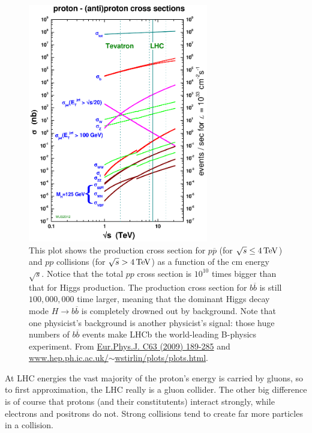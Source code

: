 \begin{figure}
\centering
\includegraphics[width=0.7\textwidth]{fig/pp_xsection}
\caption{This plot shows the production cross section for $p\overline{p}$ (for $\sqrt{s}\le 4\,\mathrm{TeV}$) and $pp$ collisions (for $\sqrt{s} > 4\,\mathrm{TeV}$) as a function of the cm energy $\sqrt{s}$. Notice that the total $pp$ cross section is $10^{10}$ times bigger than that for Higgs production. The production cross section for $b\overline{b}$ is still $100,000,000$ time larger, meaning that the dominant Higgs decay mode $H \to b\overline{b}$ is completely drowned out by background. Note that one physicist's background is another physicist's signal: those huge numbers of $b\overline{b}$ events make LHCb the world-leading B-physics experiment.
From \href{inspirehep.net/record/810127?ln=en}{Eur.Phys.J. C63 (2009) 189-285} and \href{www.hep.ph.ic.ac.uk/~wstirlin/plots/plots.html}{www.hep.ph.ic.ac.uk/$\sim$wstirlin/plots/plots.html}.}
\end{figure}
At LHC energies the vast majority of the proton's energy is carried by gluons, so to first approximation, the LHC really is a gluon collider. The other big difference is of course that protons (and their constitutents) interact strongly, while electrons and positrons do not. Strong collisions tend to create far more particles in a collision.

